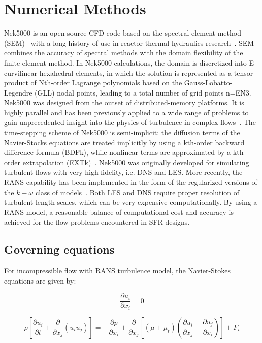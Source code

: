 \section{Numerical Methods}
\label{sec:nekrs}

Nek5000 is an open source CFD code based on the spectral element method (SEM)~\citep{Patera1984} with a long history of use in reactor thermal-hydraulics research~\citep{Merzari2019a}. SEM combines the accuracy of spectral methods with the domain flexibility of the finite element method. In Nek5000 calculations, the domain is discretized into E curvilinear hexahedral elements, in which the solution is represented as a tensor product of Nth-order Lagrange polynomials based on the Gauss-Lobatto-Legendre (GLL) nodal points, leading to a total number of grid points n=EN3. Nek5000 was designed from the outset of distributed-memory platforms. It is highly parallel and has been previously applied to a wide range of problems to gain unprecedented insight into the physics of turbulence in complex flows~\citep{Merzari2019,Martinez2019}. The time-stepping scheme of Nek5000 is semi-implicit: the diffusion terms of the Navier-Stocks equations are treated implicitly by using a kth-order backward difference formula (BDFk), while nonlinear terms are approximated by a kth-order extrapolation (EXTk)~\citep{Ho1989}. Nek5000 was originally developed for simulating turbulent flows with very high fidelity, i.e. DNS and LES. More recently, the RANS capability has been implemented in the form of the regularized versions of the $k-\omega$ class of models~\citep{Tomboulides2018}. Both LES and DNS require proper resolution of turbulent length scales, which can be very expensive computationally. By using a RANS model, a reasonable balance of computational cost and accuracy is achieved for the flow problems encountered in SFR designs. 

\subsection{Governing equations}
\label{sec:nek1}
For incompressible flow with RANS turbulence model, the Navier-Stokes equations are given by:

\begin{equation}
    \frac{\partial u_i}{\partial x_i}  =  0
\end{equation}

\begin{equation}
 \rho \left[ \frac{\partial u_i}{\partial t} + \frac{\partial }{\partial x_j}(u_i u_j) \right] =  -\frac{\partial p}{\partial x_i} + \frac{\partial }{\partial x_j}\left[(\mu + \mu_t)( \frac{\partial u_i}{\partial x_j} + \frac{\partial u_j}{\partial x_i})\right] + F_i
\end{equation}

